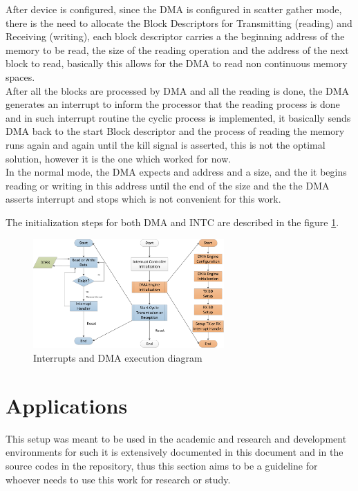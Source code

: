After device is configured, since the DMA is configured in scatter gather mode,
there is the need to allocate the Block Descriptors for Transmitting (reading)
and Receiving (writing), each block descriptor carries a the beginning address
of the memory to be read, the size of the reading operation and the address of
the next block to read, basically this allows for the DMA to read non continuous
memory spaces.\\

After all the blocks are processed by DMA and all the reading is done, the DMA
generates an interrupt to inform the processor that the reading process is done
and in such interrupt routine the cyclic process is implemented, it basically
sends DMA back to the start Block descriptor and the process of reading the
memory runs again and again until the kill signal is asserted, this is not the
optimal solution, however it is the one which worked for now.\\

In the normal mode, the DMA expects and address and a size, and the it begins
reading or writing in this address until the end of the size and the the DMA
asserts interrupt and stops which is not convenient for this work.

The initialization steps for both DMA and INTC are described in the figure
\ref{fig:intcdmainit}.

\begin{figure}[htbp]
    \centering
    \includegraphics[width=0.65\textwidth]{./figures/dma_intc_driver}
    \caption{ Interrupts and DMA execution diagram
    \label{fig:intcdmainit}}
\end{figure}

\section{Applications}

This setup was meant to be used in the academic and research and development
environments for such it is extensively documented in this document and in the
source codes in the repository, thus this section aims to be a guideline for
whoever needs to use this work for research or study.

